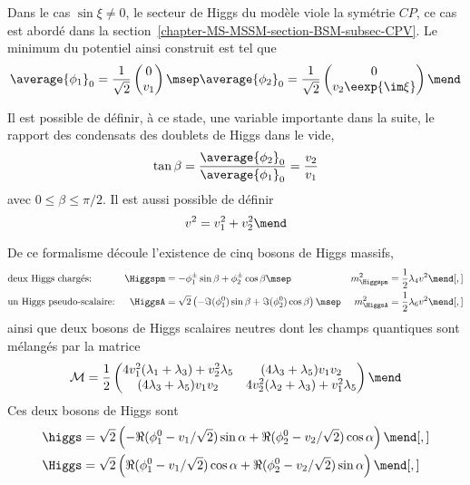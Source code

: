 Dans le cas $\sin\xi\neq0$, le secteur de Higgs du modèle viole la symétrie $CP$,
ce cas est abordé dans la section~\ref{chapter-MS-MSSM-section-BSM-subsec-CPV}.
Le minimum du potentiel ainsi construit est tel que
\begin{equation}
\average{\phi_1}_0 = \frac{1}{\sqrt{2}} \begin{pmatrix}
0\\v_1
\end{pmatrix}
\msep
\average{\phi_2}_0 = \frac{1}{\sqrt{2}} \begin{pmatrix}
0\\v_2 \eexp{\im\xi}
\end{pmatrix}
\mend
\end{equation}
\par Il est possible de définir, à ce stade, une variable importante dans la suite, le rapport des condensats des doublets de Higgs dans le vide,
\begin{equation}
\tan\beta = \frac{\average{\phi_2}_0}{\average{\phi_1}_0} = \frac{v_2}{v_1}
\label{eq-tan_beta-2HDM}
\end{equation}
avec $0\leq\beta\leq\pi/2$.
Il est aussi possible de définir
\begin{equation}
v^2 = v_1^2+v_2^2
\mend
\end{equation}
\par De ce formalisme découle l'existence de cinq bosons de Higgs massifs,
\begin{align}
&
\text{deux Higgs chargés:}
&
\Higgspm &= - \phi_1^\pm \sin\beta + \phi_2^\pm \cos\beta
\msep&
m_{\Higgspm}^2 &= \frac{1}{2} \lambda_4 v^2
\mend[,]
\\
&
\text{un Higgs pseudo-scalaire:}
&
\HiggsA &= \sqrt{2}\left(-\Im(\phi_1^0)\sin\beta+\Im(\phi_2^0)\cos\beta\right)
\msep&
m_{\HiggsA}^2 &= \frac{1}{2} \lambda_6 v^2
\mend[,]
\end{align}
ainsi que deux bosons de Higgs scalaires neutres dont les champs quantiques sont mélangés par la matrice
\begin{equation}
\mathcal{M} = \frac{1}{2} \begin{pmatrix}
4v_1^2 (\lambda_1+\lambda_3) + v_2^2\lambda_5 & (4\lambda_3+\lambda_5)v_1v_2 \\
(4\lambda_3+\lambda_5)v_1v_2 & 4v_2^2 (\lambda_2+\lambda_3) + v_1^2\lambda_5
\end{pmatrix}
\mend
\end{equation}
Ces deux bosons de Higgs sont
\begin{align}
\higgs &= \sqrt{2}\left(-\Re(\phi_1^0-v_1/\sqrt{2})\sin\alpha+\Re(\phi_2^0-v_2/\sqrt{2})\cos\alpha\right)
\mend[,]
\\
\Higgs &= \sqrt{2}\left(\Re(\phi_1^0-v_1/\sqrt{2})\cos\alpha+\Re(\phi_2^0-v_2/\sqrt{2})\sin\alpha\right)
\mend[,]
\end{align}

